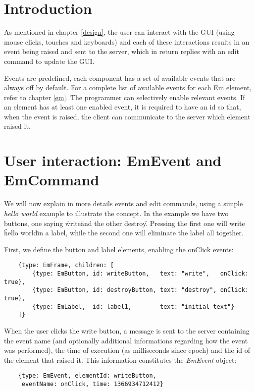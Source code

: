 
\section{Introduction}

As mentioned in chapter \ref{design}, the user can interact with the GUI (using mouse clicks, touches and keyboards) and each of these interactions results in an event being raised and sent to the server, which in return replies with an edit command to update the GUI.

Events are predefined, each component has a set of available events that are always off by default. For a complete list of available events for each Em element, refer to chapter \ref{em}. The programmer can selectively enable relevant events. If an element has at least one enabled event, it is required to have an id so that, when the event is raised, the client can communicate to the server which element raised it.

\section{User interaction: EmEvent and EmCommand}

We will now explain in more details events and edit commands, using a simple \textit{hello world} example to illustrate the concept.
In the example we have two buttons, one saying \"write\" and the other \"destroy\". Pressing the first one will write \"hello world\" in a label, while the second one will eliminate the label all together.

First, we define the button and label elements, enabling the onClick events:

\begin{verbatim}
    {type: EmFrame, children: [
        {type: EmButton, id: writeButton,   text: "write",   onClick: true},
        {type: EmButton, id: destroyButton, text: "destroy", onClick: true},
        {type: EmLabel,  id: label1,        text: "initial text"}
    ]}
\end{verbatim}

When the user clicks the write button, a message is sent to the server containing the event name (and optionally additional informations regarding how the event was performed), the time of execution (as milliseconds since epoch) and the id of the element that raised it. This information constitutes the \textit{EmEvent} object:

\begin{verbatim}
    {type: EmEvent, elementId: writeButton,
     eventName: onClick, time: 1366934712412}
\end{verbatim}

